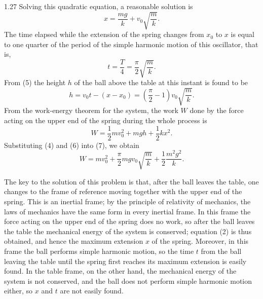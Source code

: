\begin{solution}{1.27}
Solving this quadratic equation, a reasonable solution is
\begin{equation}
x=\frac{mg}{k}+v_0\sqrt{\frac{m}{k}}. \tag{4}
\end{equation}
The time elapsed while the extension of the spring changes from $x_0$ to $x$ is equal to one
quarter of the period of the simple harmonic motion of this oscillator, that is,
\begin{equation}
t=\frac{T}{4}=\frac{\pi}{2}\sqrt{\frac{m}{k}}. \tag{5}
\end{equation}
From (5) the height $h$ of the ball above the table at this instant is found to be
\begin{equation}
h=v_0t-(x-x_0)=\left(\frac{\pi}{2}-1\right)v_0\sqrt{\frac{m}{k}}. \tag{6}
\end{equation}
From the work-energy theorem for the system, the work $W$ done by the force acting on the upper
end of the spring during the whole process is
\begin{equation}
W=\frac{1}{2}mv_0^2+mgh+\frac{1}{2}kx^2. \tag{7}
\end{equation}
Substituting (4) and (6) into (7), we obtain
\begin{equation*}
W=mv_0^2+\frac{\pi}{2}mgv_0\sqrt{\frac{m}{k}}+\frac{1}{2}\frac{m^2g^2}{k}.
\end{equation*}

\begin{commentary}
The key to the solution of this problem is that, after the ball leaves the table, one changes
to the frame of reference moving together with the upper end of the spring. This is an inertial
frame; by the principle of relativity of mechanics, the laws of mechanics have the same form in
every inertial frame. In this frame the force acting on the upper end of the spring does no
work, so after the ball leaves the table the mechanical energy of the system is conserved;
equation (2) is thus obtained, and hence the maximum extension $x$ of the spring. Moreover, in
this frame the ball performs simple harmonic motion, so the time $t$ from the ball leaving the
table until the spring first reaches its maximum extension is easily found. In the table frame,
on the other hand, the mechanical energy of the system is not conserved, and the ball does not
perform simple harmonic motion either, so $x$ and $t$ are not easily found.
\end{commentary}
\end{solution}

